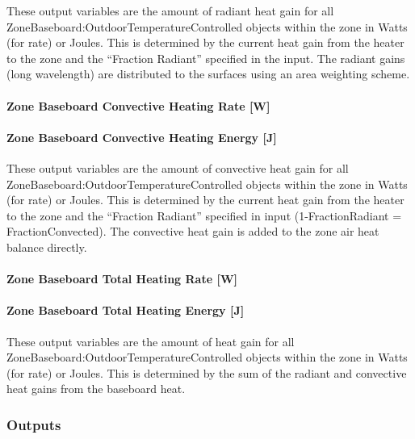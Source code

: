 These output variables are the amount of radiant heat gain for all Zone\-Baseboard:\-Outdoor\-Temperature\-Controlled objects within the zone in Watts (for rate) or Joules. This is determined by the current heat gain from the heater to the zone and the ``Fraction Radiant'' specified in the input. The radiant gains (long wavelength) are distributed to the surfaces using an area weighting scheme.

\paragraph{Zone Baseboard Convective Heating Rate {[}W{]}}\label{zone-baseboard-convective-heating-rate-w}

\paragraph{Zone Baseboard Convective Heating Energy {[}J{]}}\label{zone-baseboard-convective-heating-energy-j}

These output variables are the amount of convective heat gain for all Zone\-Baseboard:\-Outdoor\-Temperature\-Controlled objects within the zone in Watts (for rate) or Joules. This is determined by the current heat gain from the heater to the zone and the ``Fraction Radiant'' specified in input (1-FractionRadiant = FractionConvected). The convective heat gain is added to the zone air heat balance directly.

\paragraph{Zone Baseboard Total Heating Rate {[}W{]}}\label{zone-baseboard-total-heating-rate-w}

\paragraph{Zone Baseboard Total Heating Energy {[}J{]}}\label{zone-baseboard-total-heating-energy-j}

These output variables are the amount of heat gain for all Zone\-Baseboard:\-Outdoor\-Temperature\-Controlled objects within the zone in Watts (for rate) or Joules. This is determined by the sum of the radiant and convective heat gains from the baseboard heat.

\subsubsection{Outputs}\label{outputs-15-001}

